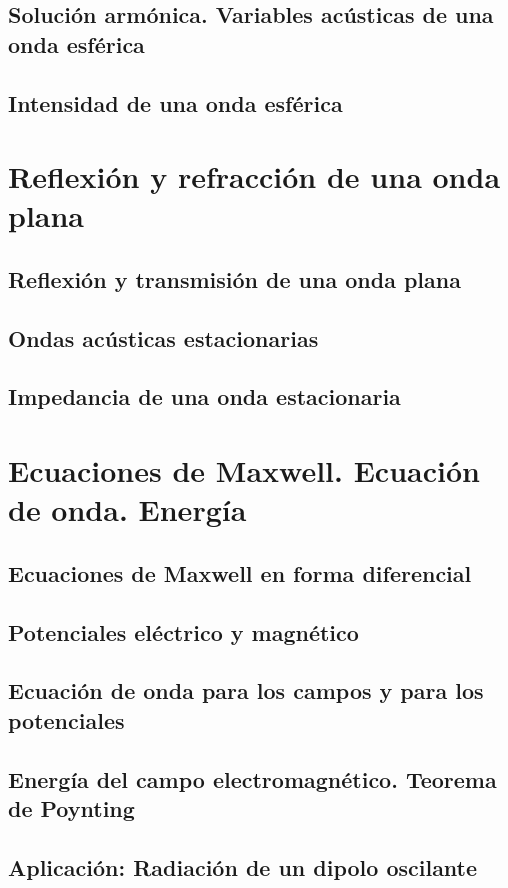 \documentclass[a4paper]{book}
\begin{document}
\section{Solución armónica. Variables acústicas de una onda esférica}
\section{Intensidad de una onda esférica}

\chapter{Reflexión y refracción de una onda plana}
\section{Reflexión y transmisión de una onda plana}
\section{Ondas acústicas estacionarias}
\section{Impedancia de una onda estacionaria}

\chapter{Ecuaciones de Maxwell. Ecuación de onda. Energía}
\section{Ecuaciones de Maxwell en forma diferencial}
\section{Potenciales eléctrico y magnético}
\section{Ecuación de onda para los campos y para los potenciales}
\section{Energía del campo electromagnético. Teorema de Poynting}
\section{Aplicación: Radiación de un dipolo oscilante}
\end{document}

